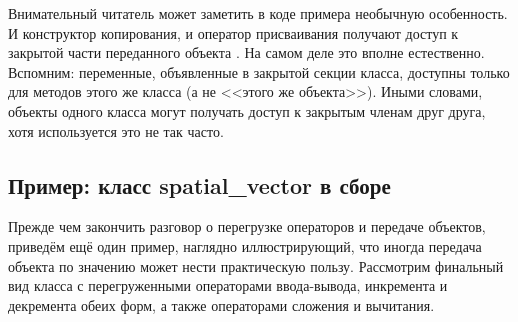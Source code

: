 Внимательный читатель может заметить в коде примера необычную особенность. И конструктор копирования,
и оператор присваивания получают доступ к закрытой части переданного объекта
. На самом деле это вполне естественно. Вспомним:  переменные, объявленные
в закрытой секции класса, доступны только для методов этого же класса (а не <<этого же объекта>>). Иными словами, объекты
одного класса могут получать доступ к закрытым членам друг друга, хотя используется это не так часто.

\subsection[Пример: класс spatial\_vector в сборе]{Пример: класс spatial\_vector в сборе}
\label{ch10:2.3}
Прежде чем закончить разговор о перегрузке операторов и передаче
объектов, приведём ещё один пример, наглядно иллюстрирующий, что иногда передача объекта по значению может нести
практическую пользу. Рассмотрим финальный вид класса
 с перегруженными операторами
ввода-вывода, инкремента и декремента обеих форм, а также операторами сложения и вычитания. 
